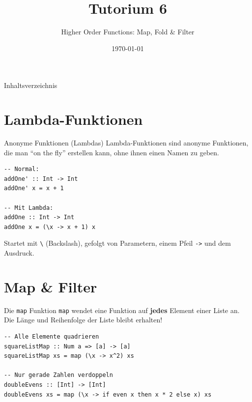 \documentclass[aspectratio=169,11pt]{beamer}
\title{\textbf{Tutorium 6}}
\subtitle{Higher Order Functions: Map, Fold \& Filter}
\institute{Grundlagen der Praktischen Informatik}
\author{}
\date{\today}
\begin{document}
\begin{frame}[plain]
    \titlepage
\end{frame}

\begin{frame}{Inhaltsverzeichnis}
    \tableofcontents
\end{frame}

\section{Lambda-Funktionen}

\begin{frame}[fragile]{Anonyme Funktionen (Lambdas)}
    Lambda-Funktionen sind anonyme Funktionen, die man ``on the fly'' erstellen kann, ohne ihnen einen Namen zu geben.
    
    \begin{tcolorbox}[modernbox, title=Syntax einer Lambda-Funktion]
\begin{lstlisting}
-- Normal:
addOne' :: Int -> Int
addOne' x = x + 1

-- Mit Lambda:
addOne :: Int -> Int
addOne x = (\x -> x + 1) x
\end{lstlisting}
    \end{tcolorbox}
    \small Startet mit \texttt{\textbackslash} (Backslash), gefolgt von Parametern, einem Pfeil \texttt{->} und dem Ausdruck.
\end{frame}

\section{Map \& Filter}

\begin{frame}[fragile]{Die \texttt{map} Funktion}
    \texttt{map} wendet eine Funktion auf \textbf{jedes} Element einer Liste an. Die Länge und Reihenfolge der Liste bleibt erhalten!
    
    \begin{tcolorbox}[modernbox, title=Beispiel: Map]
\begin{lstlisting}
-- Alle Elemente quadrieren
squareListMap :: Num a => [a] -> [a]
squareListMap xs = map (\x -> x^2) xs

-- Nur gerade Zahlen verdoppeln
doubleEvens :: [Int] -> [Int]
doubleEvens xs = map (\x -> if even x then x * 2 else x) xs
\end{lstlisting}
    \end{tcolorbox}
\end{frame}
\end{document}
